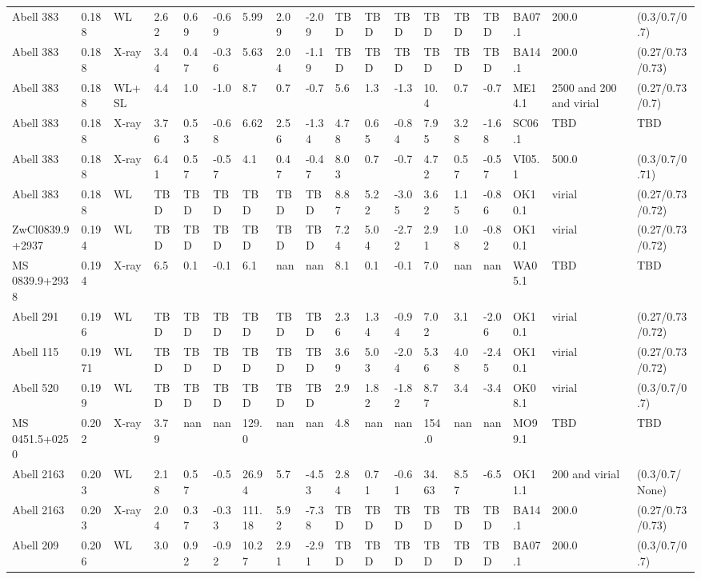 \documentclass{article}
\begin{document}
\begin{center}
\begin{landscape}
\begin{longtable}{llllllllllllllllll}
Abell 383 & 0.188 & WL & 2.62 & 0.69 & -0.69 & 5.99 & 2.09 & -2.09 & TBD & TBD & TBD & TBD & TBD & TBD & BA07.1 & 200.0 & (0.3/0.7/0.7) \\
Abell 383 & 0.188 & X-ray & 3.44 & 0.47 & -0.36 & 5.63 & 2.04 & -1.19 & TBD & TBD & TBD & TBD & TBD & TBD & BA14.1 & 200.0 & (0.27/0.73/0.73) \\
Abell 383 & 0.188 & WL+SL & 4.4 & 1.0 & -1.0 & 8.7 & 0.7 & -0.7 & 5.6 & 1.3 & -1.3 & 10.4 & 0.7 & -0.7 & ME14.1 & 2500 and 200 and virial & (0.27/0.73/0.7) \\
Abell 383 & 0.188 & X-ray & 3.76 & 0.53 & -0.68 & 6.62 & 2.56 & -1.34 & 4.78 & 0.65 & -0.84 & 7.95 & 3.28 & -1.68 & SC06.1 & TBD & TBD \\
Abell 383 & 0.188 & X-ray & 6.41 & 0.57 & -0.57 & 4.1 & 0.47 & -0.47 & 8.03 & 0.7 & -0.7 & 4.72 & 0.57 & -0.57 & VI05.1 & 500.0 & (0.3/0.7/0.71) \\
Abell 383 & 0.188 & WL & TBD & TBD & TBD & TBD & TBD & TBD & 8.87 & 5.22 & -3.05 & 3.62 & 1.15 & -0.86 & OK10.1 & virial & (0.27/0.73/0.72) \\
ZwCl0839.9+2937 & 0.194 & WL & TBD & TBD & TBD & TBD & TBD & TBD & 7.24 & 5.04 & -2.72 & 2.91 & 1.08 & -0.82 & OK10.1 & virial & (0.27/0.73/0.72) \\
MS 0839.9+2938 & 0.194 & X-ray & 6.5 & 0.1 & -0.1 & 6.1 & nan & nan & 8.1 & 0.1 & -0.1 & 7.0 & nan & nan & WA05.1 & TBD & TBD \\
Abell 291 & 0.196 & WL & TBD & TBD & TBD & TBD & TBD & TBD & 2.36 & 1.34 & -0.94 & 7.02 & 3.1 & -2.06 & OK10.1 & virial & (0.27/0.73/0.72) \\
Abell 115 & 0.1971 & WL & TBD & TBD & TBD & TBD & TBD & TBD & 3.69 & 5.03 & -2.04 & 5.36 & 4.08 & -2.45 & OK10.1 & virial & (0.27/0.73/0.72) \\
Abell 520 & 0.199 & WL & TBD & TBD & TBD & TBD & TBD & TBD & 2.9 & 1.82 & -1.82 & 8.77 & 3.4 & -3.4 & OK08.1 & virial & (0.3/0.7/0.7) \\
MS 0451.5+0250 & 0.202 & X-ray & 3.79 & nan & nan & 129.0 & nan & nan & 4.8 & nan & nan & 154.0 & nan & nan & MO99.1 & TBD & TBD \\
Abell 2163 & 0.203 & WL & 2.18 & 0.57 & -0.5 & 26.94 & 5.7 & -4.53 & 2.84 & 0.71 & -0.61 & 34.63 & 8.57 & -6.5 & OK11.1 & 200 and virial & (0.3/0.7/None) \\
Abell 2163 & 0.203 & X-ray & 2.04 & 0.37 & -0.33 & 111.18 & 5.92 & -7.38 & TBD & TBD & TBD & TBD & TBD & TBD & BA14.1 & 200.0 & (0.27/0.73/0.73) \\
Abell 209 & 0.206 & WL & 3.0 & 0.92 & -0.92 & 10.27 & 2.91 & -2.91 & TBD & TBD & TBD & TBD & TBD & TBD & BA07.1 & 200.0 & (0.3/0.7/0.7) \\

\end{longtable}
\end{landscape}
\end{center}
\end{document}
